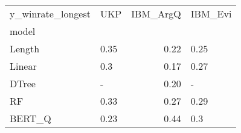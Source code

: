 \begin{tabular}{llrl}
\toprule
y\_winrate\_longest &   UKP &  IBM\_ArgQ & IBM\_Evi \\
model  &       &           &         \\
\midrule
Length &  0.35 &      0.22 &    0.25 \\
Linear &   0.3 &      0.17 &    0.27 \\
DTree  &     - &      0.20 &       - \\
RF     &  0.33 &      0.27 &    0.29 \\
BERT\_Q &  0.23 &      0.44 &     0.3 \\
\bottomrule
\end{tabular}
